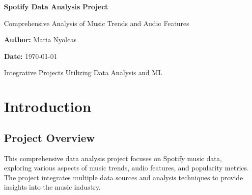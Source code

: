\documentclass[12pt,a4paper]{article}
\begin{document}
\begin{titlepage}
    \centering
    \vspace*{2cm}
    
    {\Huge\bfseries Spotify Data Analysis Project\par}
    \vspace{1cm}
    
    {\Large Comprehensive Analysis of Music Trends and Audio Features\par}
    \vspace{2cm}
    
    {\large\textbf{Author:} Maria Nyolcas\par}
    \vspace{1cm}
    
    {\large\textbf{Date:} \today\par}
    \vspace{2cm}
    
    \begin{abstract}
        This project presents a comprehensive analysis of Spotify music data, combining multiple data sources including CSV datasets and real-time API data. The analysis covers exploratory data analysis (EDA), data extraction and transformation (ETL), machine learning applications, and interactive visualizations. The project demonstrates proficiency in data science methodologies, API integration, and statistical analysis techniques applied to music industry data.
    \end{abstract}
    
    \vfill
    {\large Integrative Projects Utilizing Data Analysis and ML\par}
\end{titlepage}

\tableofcontents
\newpage

\section{Introduction}

\subsection{Project Overview}
This comprehensive data analysis project focuses on Spotify music data, exploring various aspects of music trends, audio features, and popularity metrics. The project integrates multiple data sources and analysis techniques to provide insights into the music industry.
\end{document}
